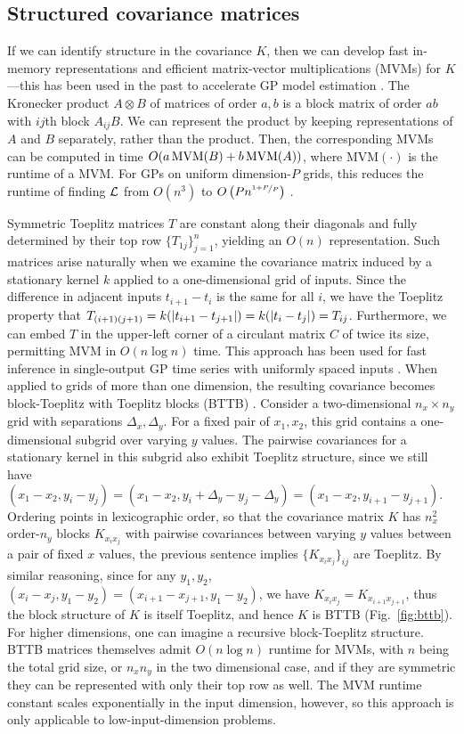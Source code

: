 \documentclass[twoside]{article}
\begin{document}
\subsection{Structured covariance matrices}

If we can identify structure in the covariance $K$, then we can develop fast in-memory representations and efficient matrix-vector multiplications (MVMs) for $K$---this has been used in the past to accelerate GP model estimation \citep{gilboa2015scaling, cunningham2008fast}. The Kronecker product $A\otimes B$ of matrices of order $a,b$ is a block matrix of order $ab$ with $ij$th block $A_{ij}B$. We can represent the product by keeping representations of $A$ and $B$ separately, rather than the product. Then, the corresponding MVMs can be computed in time $O(a\operatorname{MVM}(B)+b\operatorname{MVM}(A))$, where $\text{MVM}(\cdot)$ is the runtime of a MVM. For GPs on uniform dimension-$P$ grids, this reduces the runtime of finding $\mathcal{L}$ from $O(n^3)$ to $O\left({Pn^{\nicefrac{1+P}{P}}}\right)$ \citep{gilboa2015scaling}.

Symmetric Toeplitz matrices $T$ are constant along their diagonals and fully determined by their top row $\{T_{1j}\}_{j=1}^n$, yielding an $O(n)$ representation. Such matrices arise naturally when we examine the covariance matrix induced by a stationary kernel $k$ applied to a one-dimensional grid of inputs. Since the difference in adjacent inputs $t_{i+1}-t_{i}$ is the same for all $i$, we have the Toeplitz property that $T_{(i+1)(j+1)}=k(\left|t_{i+1} -t_{j+1}\right|)=k(\left|t_i-t_j\right|)=T_{ij}$. Furthermore, we can embed $T$ in the upper-left corner of a circulant matrix $C$ of twice its size, permitting MVM in $O(n\log n)$ time. This approach has been used for fast inference in single-output GP time series with uniformly spaced inputs \citep{cunningham2008fast}. When applied to grids of more than one dimension, the resulting covariance becomes block-Toeplitz with Toeplitz blocks (BTTB) \citep{msgp}. Consider a two-dimensional $n_x\times n_y$ grid with separations $\Delta_x,\Delta_y$. For a fixed pair of $x_1,x_2$, this grid contains a one-dimensional subgrid over varying $y$ values. The pairwise covariances for a stationary kernel in this subgrid also exhibit Toeplitz structure, since we still have $(x_1-x_2,y_i-y_j)=(x_1-x_2,y_i+\Delta_y-y_{j}-\Delta_y)=(x_1-x_2,y_{i+1}-y_{j+1})$. Ordering points in lexicographic order, so that the covariance matrix $K$ has $n_x^2$ order-$n_y$ blocks $K_{x_ix_j}$ with pairwise covariances between varying $y$ values between a pair of fixed $x$ values, the previous sentence implies $\{K_{x_ix_j}\}_{ij}$ are Toeplitz. By similar reasoning, since for any $y_1,y_2$, $(x_i-x_j,y_1-y_2)=(x_{i+1}-x_{j+1},y_1-y_2)$, we have $K_{x_ix_j}=K_{x_{i+1}x_{j+1}}$, thus the block structure of $K$ is itself Toeplitz, and hence $K$ is BTTB (Fig.~\ref{fig:bttb}). For higher dimensions, one can imagine a recursive block-Toeplitz structure. BTTB matrices themselves admit $O(n\log n)$ runtime for MVMs, with $n$ being the total grid size, or $n_xn_y$ in the two dimensional case, and if they are symmetric they can be represented with only their top row as well. The MVM runtime constant scales exponentially in the input dimension, however, so this approach is only applicable to low-input-dimension problems.
\end{document}
